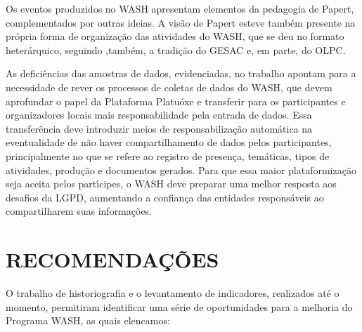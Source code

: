 \documentclass[
12pt,		%
openright,	%
twoside,  %
a4paper,			%
chapter=TITLE,		%
english,			%
french,				%
spanish,			%
brazil				%
]{USPSC-classe/USPSC}
\begin{document}
\begin{alineas}
\item Os eventos produzidos no WASH apresentam elementos da pedagogia de Papert, complementados por outras ideias. A vis\~ao de Papert esteve tamb\'em presente na pr\'opria forma de organiza\c{c}\~ao das atividades do WASH, que se deu no formato heter\'arquico, seguindo ,tamb\'em, a tradi\c{c}\~ao do GESAC e, em parte, do OLPC.
\item As defici\^encias das amostras de dados, evidenciadas, no trabalho apontam para a necessidade de rever os processos de coletas de dados do WASH, que devem aprofundar o papel da Plataforma Platu\'oxe e transferir para os participantes e organizadores locais mais responsabilidade pela entrada de dados. Essa transfer\^encia deve introduzir meios de responsabiliza\c{c}\~ao autom\'atica na eventualidade de n\~ao haver compartilhamento de dados pelos participantes, principalmente no que se refere ao registro de presen\c{c}a, tem\'aticas, tipos de atividades, produ\c{c}\~ao e documentos gerados. Para que essa maior plataformiza\c{c}\~ao seja aceita pelos part\'{\i}cipes, o WASH deve preparar uma melhor resposta aos desafios da LGPD, aumentando a confian\c{c}a das entidades respons\'aveis ao compartilharem suas informa\c{c}\~oes.
\end{alineas}

\chapter[RECOMENDA\c{C}\~OES]{RECOMENDA\c{C}\~OES}\label{RECOMENDA\c{C}\~OES}
O trabalho de historiografia e o levantamento de indicadores, realizados at\'e o momento, permitiram identificar uma s\'erie de oportunidades para a melhoria do Programa WASH, as quais elencamos:
\end{document}
